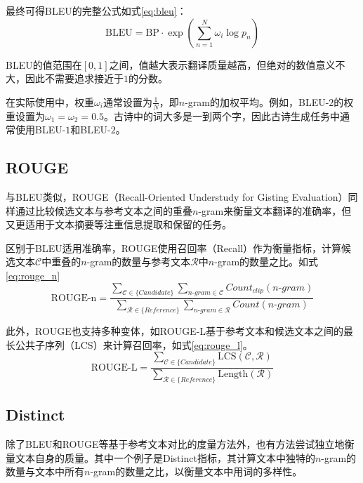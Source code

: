 最终可得BLEU的完整公式如式\eqref{eq:bleu}：
\begin{equation}
    \mathrm{BLEU}=\mathrm{BP}\cdot\exp\left(\sum^N_{n=1} \omega_i\log p_n\right) \label{eq:bleu}
\end{equation}

BLEU的值范围在$[0,1]$之间，值越大表示翻译质量越高，但绝对的数值意义不大，因此不需要追求接近于$1$的分数。

在实际使用中，权重$\omega_i$通常设置为$\frac{1}{N}$，即$n$-gram的加权平均。例如，BLEU-$2$的权重设置为$\omega_1=\omega_2=0.5$。古诗中的词大多是一到两个字，因此古诗生成任务中通常使用BLEU-$1$和BLEU-$2$。

\subsection{ROUGE}
与BLEU类似，ROUGE（Recall-Oriented Understudy for Gisting Evaluation）同样通过比较候选文本与参考文本之间的重叠$n$-gram来衡量文本翻译的准确率，但又更适用于文本摘要等注重信息提取和保留的任务。\cite{linROUGEPackageAutomatic2004}

区别于BLEU适用准确率，ROUGE使用召回率（Recall）作为衡量指标，计算候选文本$\mathcal C$中重叠的$n$-gram的数量与参考文本$\mathcal R$中$n$-gram的数量之比。如式\eqref{eq:rouge_n}
\begin{equation}
    \text{ROUGE-n} = \frac{\sum_{\mathcal C \in\{Candidate\}} \sum_{n\mbox{-}gram\in\mathcal C} Count_{clip}(n\mbox{-}gram)}{\sum_{\mathcal R \in\{Reference\}} \sum_{n\mbox{-}gram\in\mathcal R} Count(n\mbox{-}gram)} \label{eq:rouge_n}
\end{equation}

此外，ROUGE也支持多种变体，如ROUGE-L基于参考文本和候选文本之间的最长公共子序列（LCS）来计算召回率，如式\eqref{eq:rouge_l}。
\begin{equation}
    \text{ROUGE-L} = \frac{\sum_{\mathcal C \in\{Candidate\}} \text{LCS}(\mathcal C,\mathcal R)}{\sum_{\mathcal R \in\{Reference\}}\text{Length}(\mathcal R)} \label{eq:rouge_l}
\end{equation}

\subsection{Distinct}
除了BLEU和ROUGE等基于参考文本对比的度量方法外，也有方法尝试独立地衡量文本自身的质量。其中一个例子是Distinct指标，其计算文本中独特的$n$-gram的数量与文本中所有$n$-gram的数量之比，以衡量文本中用词的多样性。\cite{liDiversityPromotingObjectiveFunction2016,liGeneratingClassicalChinese2018a} 

